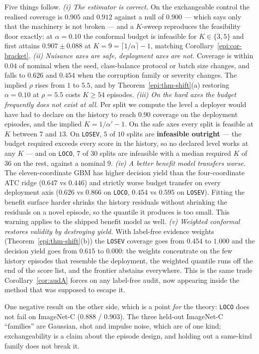 Five things follow.
\emph{(i) The estimator is correct.} On the exchangeable control the realised coverage is
$0.905$ and $0.912$ against a null of $0.900$ --- which says only that the machinery is not broken
--- and a $K$-sweep reproduces the feasibility floor exactly: at $\alpha=0.10$ the conformal budget
is infeasible for $K\in\{3,5\}$ and first attains $0.907\pm0.088$ at $K=9=\lceil1/\alpha\rceil-1$,
matching Corollary~\ref{epi:cor-bracket}.
\emph{(ii) Nuisance axes are safe, deployment axes are not.} Coverage is within $0.04$ of nominal
when the seed, class-balance protocol or batch size changes, and falls to $0.626$ and $0.454$ when
the corruption family or severity changes. The implied $\rho$ rises from $1$ to $5.5$, and by
Theorem~\ref{epi:thm-shift}(a) restoring $\alpha=0.10$ at $\rho=5.5$ costs $K\ge54$ episodes.
\emph{(iii) On the hard axes the budget frequently does not exist at all.} Per split we compute the
level a deployer would have had to declare on the history to reach $0.90$ coverage on the deployment
episodes, and the implied $K=1/\alpha'-1$. On the safe axes every split is feasible at $K$ between
$7$ and $13$. On \texttt{LOSEV}, $5$ of $10$ splits are \textbf{infeasible outright} --- the budget
required exceeds every score in the history, so no declared level works at any $K$ --- and on
\texttt{LOCO}, $7$ of $30$ splits are infeasible with a median required $K$ of $36$ on the rest,
against a nominal $9$.
\emph{(iv) A better benefit model transfers worse.} The eleven-coordinate GBM has higher decision
yield than the four-coordinate ATC ridge ($0.647$ vs $0.446$) and strictly worse budget transfer on
every deployment axis ($0.626$ vs $0.866$ on \texttt{LOCO}, $0.454$ vs $0.595$ on \texttt{LOSEV}).
Fitting the benefit surface harder shrinks the history residuals without shrinking the residuals on
a novel episode, so the quantile it produces is too small. This warning applies to the shipped
benefit model as well.
\emph{(v) Weighted conformal restores validity by destroying yield.} With label-free evidence
weights (Theorem~\ref{epi:thm-shift}(b)) the \texttt{LOSEV} coverage goes from $0.454$ to $1.000$
and the decision yield goes from $0.615$ to $0.000$: the weights concentrate on the few history
episodes that resemble the deployment, the weighted quantile runs off the end of the score list, and
the frontier abstains everywhere. This is the same trade Corollary~\ref{cor:audA} forces on any
label-free audit, now appearing inside the method that was supposed to escape it.

\noindent One negative result on the other side, which is a point \emph{for} the theory:
\texttt{LOCO} does not fail on ImageNet-C ($0.888$ / $0.903$). The three held-out ImageNet-C
``families'' are Gaussian, shot and impulse noise, which are of one kind; exchangeability is a claim
about the episode design, and holding out a same-kind family does not break it.

